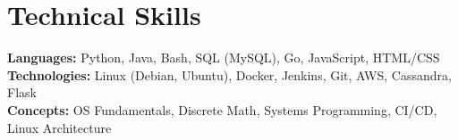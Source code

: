\documentclass[letterpaper,11pt]{article}
\begin{document}
%
\section{Technical Skills}
  \begin{itemize}[leftmargin=0.15in, label={}]
    \small{\item{
      \textbf{Languages:} Python, Java, Bash, SQL (MySQL), Go, JavaScript, HTML/CSS \\
      \textbf{Technologies:} Linux (Debian, Ubuntu), Docker, Jenkins, Git, AWS, Cassandra, Flask \\
      \textbf{Concepts:} OS Fundamentals, Discrete Math, Systems Programming, CI/CD, Linux Architecture
    }}
  \end{itemize}



\end{document}
